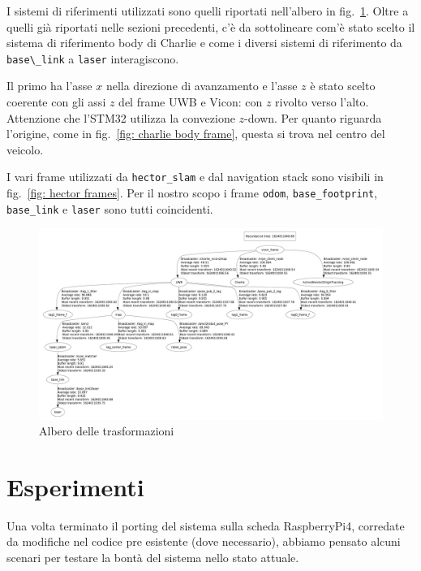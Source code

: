 I sistemi di riferimenti utilizzati sono quelli riportati nell'albero in fig.~\ref{fig: rqt_tf_tree}. 
Oltre a quelli gi\`a riportati nelle sezioni precedenti, c'\`e da sottolineare com'\`e stato scelto il sistema di riferimento body di Charlie e come i diversi sistemi di riferimento da \verb|base\_link| a \verb|laser| interagiscono.

Il primo ha l'asse $x$ nella direzione di avanzamento e l'asse $z$ \`e stato scelto coerente con gli assi $z$ del frame UWB e Vicon: con $z$ rivolto verso l'alto. Attenzione che l'STM32 utilizza la convezione $z$-down. Per quanto riguarda l'origine, come in fig.~\ref{fig: charlie body frame}, questa si trova nel centro del veicolo.

I vari frame utilizzati da \texttt{hector\_slam} e dal navigation stack sono visibili in fig.~\ref{fig: hector frames}. Per il nostro scopo i frame \texttt{odom}, \texttt{base\_footprint}, \texttt{base\_link} e \texttt{laser} sono tutti coincidenti.


\begin{figure}[]
	\centering
	\includegraphics[width=\linewidth]{tf_tree.pdf}
	\caption{Albero delle trasformazioni}
	\label{fig: rqt_tf_tree}
\end{figure}

\FloatBarrier

\newpage
\section{Esperimenti}

Una volta terminato il porting del sistema sulla scheda RaspberryPi4, corredate da modifiche nel codice pre esistente (dove necessario), abbiamo pensato alcuni scenari per testare la bontà del sistema nello stato attuale. 

